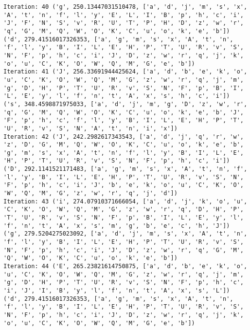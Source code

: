 \documentclass[english,man]{apa6}
\begin{document}
\begin{verbatim}
Iteration: 40 ('g', 250.13447031510478, ['a', 'd', 'j', 'm', 's', 'x', 'A', 't', 'n', 'f', 'l', 'y', 'E', 'L', 'I', 'B', 'p', 'h', 'c', 'i', 'J', 'F', 'N', 'S', 'v', 'R', 'U', 'T', 'P', 'H', 'D', 'z', 'w', 'r', 'q', 'G', 'M', 'Q', 'W', 'O', 'K', 'C', 'u', 'o', 'k', 'e', 'b']) ('d', 279.41516017326353, ['a', 'g', 'm', 's', 'x', 'A', 't', 'n', 'f', 'l', 'y', 'B', 'I', 'L', 'E', 'H', 'P', 'T', 'U', 'R', 'v', 'S', 'N', 'F', 'p', 'h', 'c', 'i', 'J', 'D', 'z', 'w', 'r', 'q', 'j', 'k', 'o', 'u', 'C', 'K', 'O', 'W', 'Q', 'M', 'G', 'e', 'b'])
Iteration: 41 ('J', 256.33691944425624, ['a', 'd', 'b', 'e', 'k', 'o', 'u', 'C', 'K', 'O', 'W', 'Q', 'M', 'G', 'z', 'w', 'r', 'q', 'j', 'm', 'g', 'D', 'H', 'P', 'T', 'U', 'R', 'v', 'S', 'N', 'F', 'p', 'B', 'I', 'L', 'E', 'y', 'l', 'f', 'n', 't', 'A', 'x', 's', 'h', 'c', 'i']) ('s', 348.4598871975033, ['a', 'd', 'j', 'm', 'g', 'D', 'z', 'w', 'r', 'q', 'G', 'M', 'Q', 'W', 'O', 'K', 'C', 'u', 'o', 'k', 'e', 'b', 'J', 'F', 'p', 'h', 'c', 'f', 'l', 'y', 'B', 'I', 'L', 'E', 'H', 'P', 'T', 'U', 'R', 'v', 'S', 'N', 'A', 't', 'n', 'i', 'x'])
Iteration: 42 ('J', 242.2982617343543, ['a', 'd', 'j', 'q', 'r', 'w', 'z', 'D', 'G', 'M', 'Q', 'W', 'O', 'K', 'C', 'u', 'o', 'k', 'e', 'b', 'g', 'm', 's', 'x', 'A', 't', 'n', 'f', 'l', 'y', 'B', 'I', 'L', 'E', 'H', 'P', 'T', 'U', 'R', 'v', 'S', 'N', 'F', 'p', 'h', 'c', 'i']) ('D', 292.1141521171483, ['a', 'g', 'm', 's', 'x', 'A', 't', 'n', 'f', 'l', 'y', 'B', 'I', 'L', 'E', 'H', 'P', 'T', 'U', 'R', 'v', 'S', 'N', 'F', 'p', 'h', 'c', 'i', 'J', 'b', 'e', 'k', 'o', 'u', 'C', 'K', 'O', 'W', 'Q', 'M', 'G', 'z', 'w', 'r', 'q', 'j', 'd'])
Iteration: 43 ('i', 274.07910371666054, ['a', 'd', 'j', 'k', 'o', 'u', 'C', 'K', 'O', 'W', 'Q', 'M', 'G', 'z', 'w', 'r', 'q', 'D', 'H', 'P', 'T', 'U', 'R', 'v', 'S', 'N', 'F', 'p', 'B', 'I', 'L', 'E', 'y', 'l', 'f', 'n', 't', 'A', 'x', 's', 'm', 'g', 'b', 'e', 'c', 'h', 'J']) ('g', 279.5204275023092, ['a', 'd', 'j', 'm', 's', 'x', 'A', 't', 'n', 'f', 'l', 'y', 'B', 'I', 'L', 'E', 'H', 'P', 'T', 'U', 'R', 'v', 'S', 'N', 'F', 'p', 'h', 'c', 'i', 'J', 'D', 'z', 'w', 'r', 'q', 'G', 'M', 'Q', 'W', 'O', 'K', 'C', 'u', 'o', 'k', 'e', 'b'])
Iteration: 44 ('E', 265.23821614750875, ['a', 'd', 'b', 'e', 'k', 'o', 'u', 'C', 'K', 'O', 'W', 'Q', 'M', 'G', 'z', 'w', 'r', 'q', 'j', 'm', 'g', 'D', 'H', 'P', 'T', 'U', 'R', 'v', 'S', 'N', 'F', 'p', 'h', 'c', 'i', 'J', 'I', 'B', 'y', 'l', 'f', 'n', 't', 'A', 'x', 's', 'L']) ('d', 279.41516017326353, ['a', 'g', 'm', 's', 'x', 'A', 't', 'n', 'f', 'l', 'y', 'B', 'I', 'L', 'E', 'H', 'P', 'T', 'U', 'R', 'v', 'S', 'N', 'F', 'p', 'h', 'c', 'i', 'J', 'D', 'z', 'w', 'r', 'q', 'j', 'k', 'o', 'u', 'C', 'K', 'O', 'W', 'Q', 'M', 'G', 'e', 'b'])

\end{verbatim}
\end{document}
